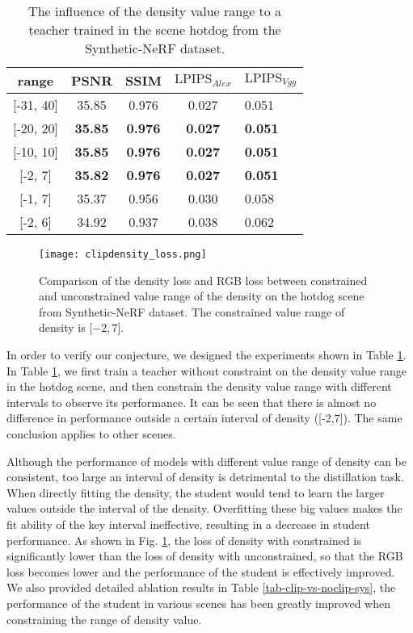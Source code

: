 \documentclass[letterpaper]{article} \usepackage{aaai23}  \usepackage{times}  \usepackage{helvet}  \usepackage{courier}  \usepackage[hyphens]{url}  \usepackage{graphicx} \urlstyle{rm} \def\UrlFont{\rm}  \usepackage{natbib}  \usepackage{caption} \frenchspacing  \setlength{\pdfpagewidth}{8.5in}  \setlength{\pdfpageheight}{11in}  \usepackage{multirow}
\begin{document}
\begin{table}[h]
\begin{tabular}{ccccl}
\hline
range                  & PSNR           & SSIM           & $\text{LPIPS}_{Alex}$    & $\text{LPIPS}_{Vgg}$     \\ \hline
{[}-31, 40{]} & 35.85          & 0.976          & 0.027          & 0.051          \\ \hline
{[}-20, 20{]}          & \textbf{35.85} & \textbf{0.976} & \textbf{0.027} & \textbf{0.051} \\
{[}-10, 10{]}          & \textbf{35.85} & \textbf{0.976} & \textbf{0.027} & \textbf{0.051} \\
{[}-2, 7{]}            & \textbf{35.82} & \textbf{0.976} & \textbf{0.027} & \textbf{0.051} \\
{[}-1, 7{]}            & 35.37          & 0.956          & 0.030          & 0.058          \\
{[}-2, 6{]}            & 34.92          & 0.937          & 0.038          & 0.062          \\ \hline
\end{tabular}
\caption{The influence of the density value range to a teacher trained in the scene hotdog from the Synthetic-NeRF dataset.}
\label{tab-clip-for-teacher}
\end{table}


\begin{figure}[ht]
    \centering
    \texttt{[image: clipdensity\_loss.png]} \caption{Comparison of the density loss and RGB loss between constrained and unconstrained value range of the density on the hotdog scene from Synthetic-NeRF dataset. The constrained value range of density is [$-2, 7$]. }
    \label{fig-clip-vs-noclip-loss}
\end{figure}

In order to verify our conjecture, we designed the experiments shown in Table \ref{tab-clip-for-teacher}. In Table \ref{tab-clip-for-teacher}, we first train a teacher without constraint on the density value range in the hotdog scene, and then constrain the density value range with different intervals to observe its performance. It can be seen that there is almost no difference in performance outside a certain interval of density ([-2,7]). The same conclusion applies to other scenes.

Although the performance of models with different value range of density can be consistent, too large an interval of density is detrimental to the distillation task. When directly fitting the density, the student would tend to learn the larger values outside the interval of the density. Overfitting these big values makes the fit ability of the key interval ineffective, resulting in a decrease in student performance. As shown in Fig. \ref{fig-clip-vs-noclip-loss}, the loss of density with constrained is significantly lower than the loss of density with unconstrained, so that the RGB loss becomes lower and the performance of the student is effectively improved. We also provided detailed ablation results in Table \ref{tab-clip-vs-noclip-sys}, the performance of the student in various scenes has been greatly improved when constraining the range of density value.
\end{document}
